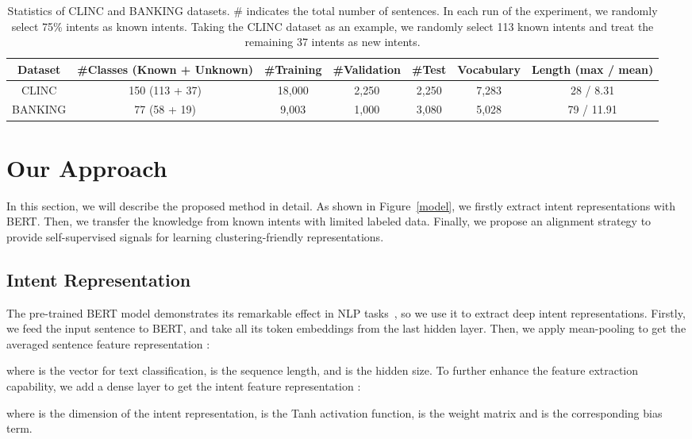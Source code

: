 \documentclass[letterpaper]{article} \usepackage{aaai21}  \usepackage{times}  \usepackage{helvet} \usepackage{courier}  \usepackage[hyphens]{url}  \usepackage{graphicx} \urlstyle{rm} \def\UrlFont{\rm}  \usepackage{natbib}  \usepackage{caption} \frenchspacing  \setlength{\pdfpagewidth}{8.5in}  \setlength{\pdfpageheight}{11in}  \usepackage{amsmath}
\begin{document}
	\begin{table*}[t!]
		\centering
		\begin{tabular}{@{} ccccccc @{}}
			\toprule
			Dataset & \#Classes (Known + Unknown) & \#Training & \#Validation & \#Test & Vocabulary & Length (max / mean) \\
			\midrule
			CLINC & 150 (113 + 37) & 18,000 & 2,250 & 2,250 & 7,283 & 28 / 8.31 \\
			BANKING & 77 (58 + 19) & 9,003 & 1,000 & 3,080 & 5,028 & 79 / 11.91 \\ 
			\bottomrule
		\end{tabular}
		\caption{ \label{datasets}  Statistics of CLINC and BANKING datasets. \# indicates the total number of sentences. In each run of the experiment, we randomly select 75\% intents as known intents. Taking the CLINC dataset as an example, we randomly select 113 known intents and treat the remaining 37 intents as new intents. }
	\end{table*}
	
	
	\section{Our Approach}
	In this section, we will describe the proposed method in detail. As shown in Figure~\ref{model}, we firstly extract intent representations with BERT. Then, we transfer the knowledge from known intents with limited labeled data. Finally, we propose an alignment strategy to provide self-supervised signals for learning clustering-friendly representations. 
	
	\subsection{Intent Representation}
	The pre-trained BERT model demonstrates its remarkable effect in NLP tasks~\citep{devlin2018bert}, so we use it to extract deep intent representations. Firstly, we feed the  input sentence  to BERT, and take all its token embeddings    from the last hidden layer. Then, we apply mean-pooling to get the averaged sentence feature representation :
	
	where  is the vector for text classification,  is the sequence length, and  is the hidden size. To further enhance the feature extraction capability, we add a dense layer  to get the intent feature representation :
	
	where  is the dimension of the intent representation,  is the Tanh activation function,   is the weight matrix and  is the corresponding bias term.
	
\end{document}
